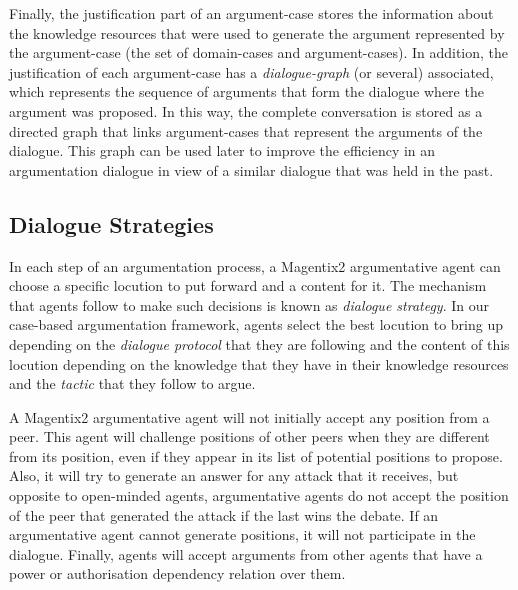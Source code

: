 Finally, the justification part of an argument-case stores the information about the knowledge resources that were used to generate the argument represented by the argument-case (the set of domain-cases and argument-cases). In addition, the justification of each argument-case has a \emph{dialogue-graph} (or several) associated, which represents the sequence of arguments that form the dialogue where the argument was proposed. In this way, the complete conversation is stored as a directed graph that links argument-cases that represent the arguments of the dialogue. This graph can be used later to improve the efficiency in an argumentation dialogue in view of a similar dialogue that was held in the past.

\subsection{Dialogue Strategies}
\label{subsubsec:strategies}

In each step of an argumentation process, a Magentix2 argumentative agent can choose a specific locution to put forward and a content for it. The mechanism that agents follow to make such decisions is known as \emph{dialogue strategy}.
In our case-based argumentation framework, agents select the best locution to bring up depending on the \emph{dialogue protocol} that they are following and the content of this locution depending on the knowledge that they have in their knowledge resources and the \emph{tactic} that they follow to argue.

A Magentix2 argumentative agent will not initially accept any position from a peer. This agent will challenge positions of other peers when they are different from its position, even if they appear in its list of potential positions to propose. Also, it will try to generate an answer for any attack that it receives, but opposite to open-minded agents, argumentative agents do not accept the position of the peer that generated the attack if the last wins the debate. If an argumentative agent cannot generate positions, it will not participate in the dialogue. Finally, agents will accept arguments from other agents that have a power or authorisation dependency relation over them. %

